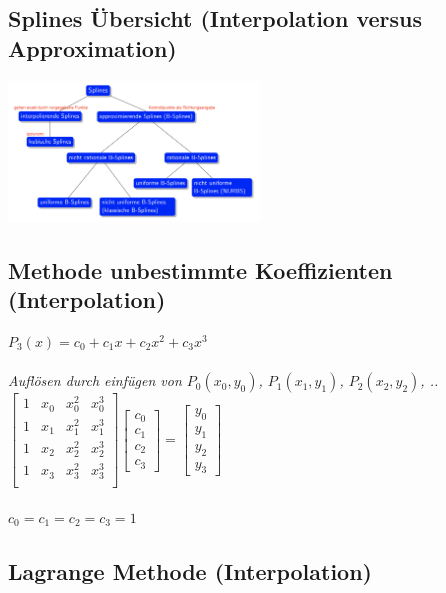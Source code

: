 \subsection{Splines Übersicht (Interpolation versus Approximation)}
\includegraphics[width=0.5\textwidth]{assets/InterpolationVSApproximation.png}


\subsection{Methode unbestimmte Koeffizienten (Interpolation)}
$P_3(x) = c_0 + c_1x + c_2x^2 + c_3x^3$ \\
\\
\textit{Auflösen durch einfügen von $P_0(x_0, y_0)$, $P_1(x_1, y_1)$, $P_2(x_2, y_2)$, ..}
\\
    $\begin{bmatrix}
    1 & x_0 & x_0^2 & x_0^3 \\
    1 & x_1 & x_1^2 & x_1^3 \\
    1 & x_2 & x_2^2 & x_2^3 \\
    1 & x_3 & x_3^2 & x_3^3 \\
\end{bmatrix}
\begin{bmatrix}
    c_0 \\
    c_1 \\
    c_2 \\
    c_3
\end{bmatrix} =
\begin{bmatrix}
    y_0 \\
    y_1 \\
    y_2 \\
    y_3
\end{bmatrix}$ \\
\\
\textit{$c_0 = c_1 = c_2 = c_3 = 1$}

\subsection{Lagrange Methode (Interpolation)}

